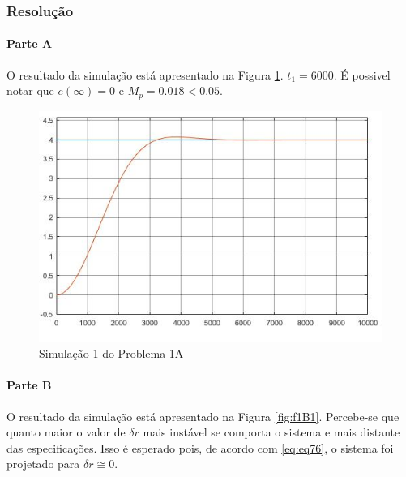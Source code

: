 \documentclass[
]{book}
\theoremstyle{definition}
\theoremstyle{definition}
\theoremstyle{definition}
\theoremstyle{remark}
\begin{document}
\hypertarget{resoluuxe7uxe3o-20}{%
\subsubsection*{Resolução}\label{resoluuxe7uxe3o-20}}

\hypertarget{parte-a-8}{%
\paragraph{Parte A}\label{parte-a-8}}

O resultado da simulação está apresentado na Figura \ref{fig:f1A1}. \(t_1 = 6000\). É possivel notar que \(e(\infty) = 0\) e \(M_p = 0.018 < 0.05\).

\begin{figure}

{\centering \includegraphics[width=0.8\linewidth]{Imagens/Lab7/Resolução/p1A1} 

}

\caption{Simulação 1 do Problema 1A}\label{fig:f1A1}
\end{figure}

\hypertarget{parte-b-8}{%
\paragraph{Parte B}\label{parte-b-8}}

O resultado da simulação está apresentado na Figura \ref{fig:f1B1}. Percebe-se que quanto maior o valor de \(\delta r\) mais instável se comporta o sistema e mais distante das especificações. Isso é esperado pois, de acordo com \eqref{eq:eq76}, o sistema foi projetado para \(\delta r \cong 0\).
\end{document}
